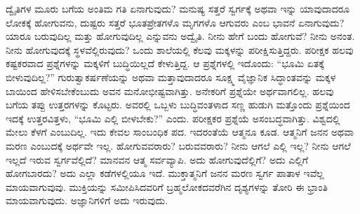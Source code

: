 ದ್ವೈತಿಗಳ ಮೂರು ಬಗೆಯ ಅಂತಿಮ ಗತಿ ಏನಾಗುವುದು? ಮನುಷ್ಯ ಸತ್ತರೆ ಸ್ವರ್ಗಕ್ಕೆ ಅಥವಾ ಇನ್ನು ಯಾವುದಾದರೂ ಲೋಕಕ್ಕೆ ಹೋಗುವನು, ದುಷ್ಟರು ಸತ್ತರೆ ಭೂತಪ್ರೇತಗಳೊ ಮೃಗಗಳೊ ಆಗುವರು ಎಂಬ ಭಾವನೆ ಏನಾಗುವುದು? ಯಾರೂ ಬರುವುದಿಲ್ಲ ಮತ್ತು ಹೋಗುವುದಿಲ್ಲ ಎನ್ನುವನು ಅದ್ವೈತಿ. ನೀನು ಹೇಗೆ ಬಂದು ಹೋಗುವೆ? ನೀನು ಅನಂತ. ನೀನು ಹೋಗುವುದಕ್ಕೆ ಸ್ಥಳವೆಲ್ಲಿರುವುದು? ಒಂದು ಶಾಲೆಯಲ್ಲಿ ಕೆಲವು ಮಕ್ಕಳನ್ನು ಪರೀಕ್ಷಿಸುತ್ತಿದ್ದರು. ಪರೀಕ್ಷಕ ಹಲವು ಕಷ್ಟಕರವಾದ ಪ್ರಶ್ನೆಗಳನ್ನು ಮಕ್ಕಳಿಗೆ ಬುದ್ಧಿಯಿಲ್ಲದೆ ಕೇಳುತ್ತಿದ್ದ. ಆ ಪ್ರಶ್ನೆಗಳಲ್ಲಿ ಇದೊಂದು: “ಭೂಮಿ ಏತಕ್ಕೆ ಬೀಳುವುದಿಲ್ಲ?” ಗುರುತ್ವಾಕರ್ಷಣೆಯನ್ನು ಅಥವಾ ಮತ್ತಾವುದಾದರೂ ಸೂಕ್ಷ್ಮ ವೈಜ್ಞಾನಿಕ ಸಿದ್ಧಾಂತವನ್ನು ಮಕ್ಕಳ ಬಾಯಿಂದ ಹೇಳಿಸಬೇಕೆಂಬುದು ಅವನ ಮನೋಭೀಷ್ಟವಾಗಿತ್ತು. ಅನೇಕರಿಗೆ ಪ್ರಶ್ನೆಯೇ ಅರ್ಥವಾಗಲಿಲ್ಲ. ಹಲವು ಬಗೆಯ ತಪ್ಪು ಉತ್ತರಗಳನ್ನು ಕೊಟ್ಟರು. ಅವರಲ್ಲಿ ಒಬ್ಬಳು ಬುದ್ಧಿವಂತಳಾದ ಸಣ್ಣ ಹುಡುಗಿ ಮತ್ತೊಂದು ಪ್ರಶ್ನೆಯಿಂದ ಇದಕ್ಕೆ ಉತ್ತರವಿತ್ತಳು, “ಭೂಮಿ ಎಲ್ಲಿ ಬೀಳಬೇಕು?” ಎಂದು. ಪರೀಕ್ಷಕರ ಪ್ರಶ್ನೆಯೆ ಅಸಂಬದ್ಧವಾಗಿತ್ತು. ವಿಶ್ವದಲ್ಲಿ ಮೇಲು ಕೆಳಗೆ ಎಂಬುದಿಲ್ಲ. ಇದು ಕೇವಲ ಸಾಂಬಂಧಿಕ ಪದ. ಇದರಂತೆಯೆ ಆತ್ಮನೂ ಕೂಡ. ಆತ್ಮನಿಗೆ ಜನನ ಅಥವಾ ಮರಣ ಎಂಬುದಕ್ಕೆ ಅರ್ಥವೇ ಇಲ್ಲ. ಹೋಗುವವರಾರು? ಬರುವವರಾರು? ನೀನು ಆಗಲೆ ಎಲ್ಲಿ ಇಲ್ಲ? ನೀನು ಆಗಲೆ ಇಲ್ಲದೆ ಇರುವ ಸ್ವರ್ಗವೆಲ್ಲಿದೆ? ಮಾನವನ ಆತ್ಮ ಸರ್ವವ್ಯಾಪಿ. ಅದು ಹೋಗುವುದೆಲ್ಲಿಗೆ? ಅದು ಎಲ್ಲಿಗೆ ಹೋಗಬಾರದು? ಅದು ಎಲ್ಲಾ ಕಡೆಗಳಲ್ಲಿಯೂ ಇದೆ. ಮುಕ್ತಾತ್ಮನಿಗೆ ಜನನ ಮರಣ ಸ್ವರ್ಗ ಪಾತಾಳ ಇವೆಲ್ಲ ಮಾಯವಾಗುವುವು. ಮುಕ್ತಿಯನ್ನು ಸಮೀಪಿಸಿದವರಿಗೆ ಬ್ರಹ್ಮಲೋಕದವರೆಗಿನ ದೃಶ್ಯಗಳನ್ನು ತೋರಿ ಈ ಭ್ರಾಂತಿ ಮಾಯವಾಗುವುದು. ಅಜ್ಞಾನಿಗಳಿಗೆ ಅದು ಇರುವುದು.

\vskip 0.2cm

